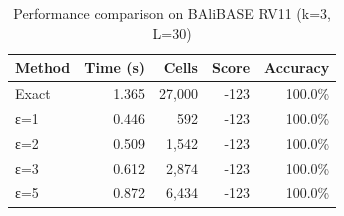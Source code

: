 \begin{table}[htbp]
\centering
\caption{Performance comparison on BAliBASE RV11 (k=3, L=30)}
\begin{tabular}{lrrrr}
\hline
Method & Time (s) & Cells & Score & Accuracy \\
\hline
Exact & 1.365 & 27,000 & -123 & 100.0\% \\
ε=1 & 0.446 & 592 & -123 & 100.0\% \\
ε=2 & 0.509 & 1,542 & -123 & 100.0\% \\
ε=3 & 0.612 & 2,874 & -123 & 100.0\% \\
ε=5 & 0.872 & 6,434 & -123 & 100.0\% \\
\hline
\end{tabular}
\end{table}

